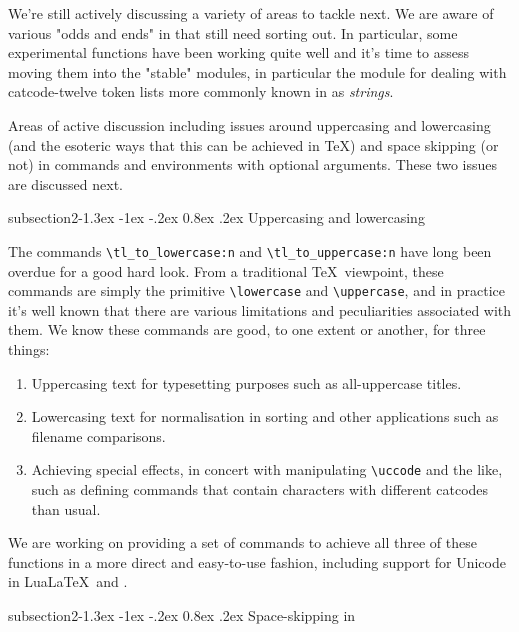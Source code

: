 \documentclass{ltnews}
\makeatletter
\providecommand\LuaLaTeX{Lua\LaTeX}
\newcommand{\@subheadingfont}{%
   \sffamily\slshape
   \let\LaTeX\cmssLaTeX\let\TeX\cmssTeX
}
\renewcommand{\subsection}{%
   \@startsection
      {subsection}{2}{\z@}{-1.3ex \@plus -1ex \@minus -.2ex}%
      {0.8ex \@plus.2ex}{\@subheadingfont}%
}
\makeatother
\begin{document}
We're still actively discussing a variety of areas to tackle next.
We are aware of various "odds and ends" in  that still need sorting out.
In particular, some experimental functions have been working quite well and it's time to assess moving them into the "stable" modules, in particular the  module for dealing with catcode-twelve token lists more commonly known in  as \emph{strings}.

Areas of active discussion including issues around uppercasing and lowercasing (and the esoteric ways that this can be achieved in \TeX) and space skipping (or not) in commands and environments with optional arguments.
These two issues are discussed next.

\subsection{Uppercasing and lowercasing}

The commands \verb"\tl_to_lowercase:n" and \verb"\tl_to_uppercase:n" have long been overdue for a good hard look.
From a traditional \TeX\ viewpoint, these commands are simply the primitive \verb"\lowercase" and \verb"\uppercase", and in practice it's well known that there are various limitations and peculiarities associated with them.
We know these commands are good, to one extent or another, for three things:
\begin{enumerate}
\item
Uppercasing text for typesetting purposes such as all-uppercase titles.
\item
Lowercasing text for normalisation in sorting and other applications such as filename comparisons.
\item
Achieving special effects, in concert with manipulating \verb"\uccode" and the like, such as defining commands that contain characters with different catcodes than usual.
\end{enumerate}
We are working on providing a set of commands to achieve all three of these functions in a more direct and easy-to-use fashion, including support for Unicode in \LuaLaTeX\ and \XeLaTeX.

\pagebreak

\subsection{Space-skipping in }
\end{document}
